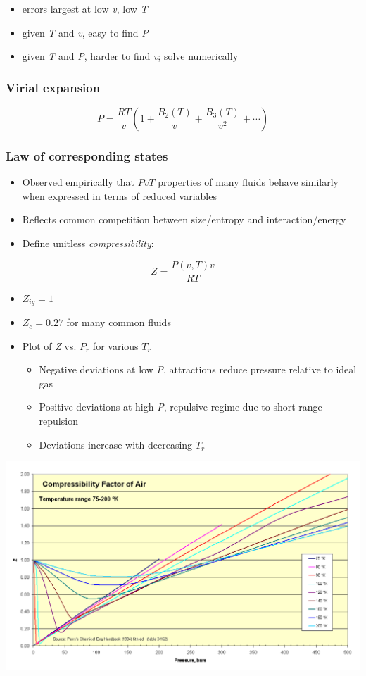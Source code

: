 \documentclass[11pt]{article}
\begin{document}
\begin{itemize}
\item errors largest at low \emph{v}, low \emph{T}
\item given \emph{T} and \emph{v}, easy to find \emph{P}
\item given \emph{T} and \emph{P}, harder to find \emph{v}; solve numerically
\end{itemize}

\subsubsection{Virial expansion}
\label{sec-7-4-4}

\[ P= \frac{RT}{v} \left ( 1 + \frac{B_{2}(T)}{v} + \frac{B_{3}(T)}{v^{2}} + \cdots \right ) \]
\subsubsection{Law of corresponding states}
\label{sec-7-4-5}
\begin{itemize}
\item Observed empirically that \(PvT\) properties of many fluids behave similarly when expressed in terms of reduced variables
\item Reflects common competition between size/entropy and interaction/energy
\item Define unitless \emph{compressibility}:
\end{itemize}
\[ Z = \frac{P(v,T) v}{RT} \]

\begin{itemize}
\item \(Z_{ig} = 1 \)
\item \( Z_{c} = 0.27 \) for many common fluids
\item Plot of \emph{Z} vs. \(P_{r}\) for various \(T_{r}\)
\begin{itemize}
\item Negative deviations at low \emph{P}, attractions reduce pressure relative to ideal gas
\item Positive deviations at high \emph{P}, repulsive regime due to short-range repulsion
\item Deviations increase with decreasing \(T_{r}\)
\end{itemize}
\end{itemize}

\includegraphics[width=.9\linewidth]{./figs/AirCompressibility.png}
\end{document}
